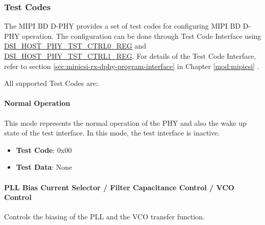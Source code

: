\documentclass[main\_\_EN.tex]{subfiles}
\begin{document}
\subsubsection{Test Codes}
The MIPI BD D-PHY provides a set of test codes for configuring MIPI BD D-PHY operation. The configuration can be done through Test Code Interface using \hyperref[regdesc:DSIHOSTPHYTSTCTRL0REG]{DSI\_HOST\_PHY\_TST\_CTRL0\_REG} and \hyperref[regdesc:DSIHOSTPHYTSTCTRL1REG]{DSI\_HOST\_PHY\_TST\_CTRL1\_REG}. For details of the Test Code Interface, refer to section \ref{sec:mipicsi-rx-dphy-program-interface} in Chapter \ref{mod:mipicsi} \textit{}.

All supported Test Codes are:

\paragraph{Normal Operation}
\label{sec:normal-operation}
This mode represents the normal operation of the PHY and also the wake up state of the test interface. In this mode, the test interface is inactive.

\begin{itemize}
    \item \textbf{Test Code}: 0x00
    \item \textbf{Test Data}: None
\end{itemize}

\paragraph{PLL Bias Current Selector / Filter Capacitance Control / VCO Control}
\label{sec:test-code-0x10}
Controls the biasing of the PLL and the VCO transfer function.
\end{document}
